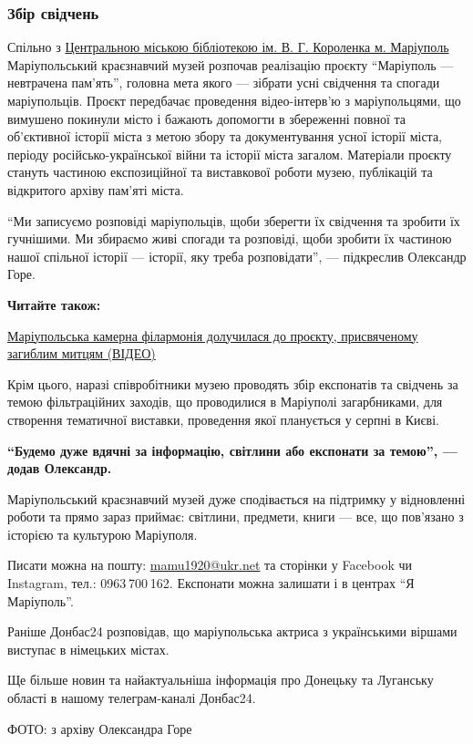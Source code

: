 \subsubsection{Збір свідчень}

Спільно з
\href{https://donbas24.news/news/vidnovlennya-knizkovogo-fondu-mariupolya-koli-vidkrijetsya-nova-biblioteka}{Центральною
міською бібліотекою ім. В. Г. Короленка м. Маріуполь} Маріупольський
краєзнавчий музей розпочав реалізацію проєкту \enquote{Маріуполь — невтрачена
пам'ять}, головна мета якого — зібрати усні свідчення та спогади маріупольців.
Проєкт передбачає проведення відео-інтерв'ю з маріупольцями, що вимушено
покинули місто і бажають допомогти в збереженні повної та об'єктивної історії
міста з метою збору та документування усної історії міста, періоду
російсько-української війни та історії міста загалом. Матеріали проєкту стануть
частиною експозиційної та виставкової роботи музею, публікацій та відкритого
архіву пам'яті міста.

\begin{leftbar}
	\begingroup
\enquote{Ми записуємо розповіді маріупольців, щоби зберегти їх свідчення та
зробити їх гучнішими. Ми збираємо живі спогади та розповіді, щоби
зробити їх частиною нашої спільної історії — історії, яку треба
розповідати}, — підкреслив Олександр Горе.
	\endgroup
\end{leftbar}


\textbf{Читайте також:} 

\href{https://donbas24.news/news/mariupolska-kamerna-filarmoniya-dolucilasya-do-projektu-prisvyacenomu-zagiblim-mitcyam}{Маріупольська камерна філармонія долучилася до проєкту, присвяченому загиблим митцям (ВІДЕО)}

Крім цього, наразі співробітники музею проводять збір експонатів та свідчень за
темою фільтраційних заходів, що проводилися в Маріуполі загарбниками, для
створення тематичної виставки, проведення якої планується у серпні в Києві. 

\begin{leftbar}
	\begingroup
		\bfseries
			\enquote{Будемо дуже вдячні за інформацію, світлини або експонати за темою}, — додав Олександр.
	\endgroup
\end{leftbar}

Маріупольський краєзнавчий музей дуже сподівається на підтримку у відновленні
роботи та прямо зараз приймає: світлини, предмети, книги — все, що пов'язано з
історією та культурою Маріуполя.

Писати можна на пошту: \url{mamu1920@ukr.net} та сторінки у Facebook чи Instagram,
тел.: 0963 700 162. Експонати можна залишати і в центрах \enquote{Я Маріуполь}.

Раніше Донбас24 розповідав, що маріупольська актриса з українськими віршами виступає в німецьких містах.

Ще більше новин та найактуальніша інформація про Донецьку та Луганську області в нашому телеграм-каналі Донбас24.

ФОТО: з архіву Олександра Горе
